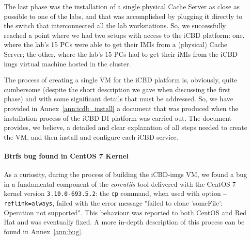 The last phase was the installation of a single physical Cache Server as close as possible to one of the labs, and that was accomplished by plugging it directly to the switch that interconnected all the lab 
workstations. So, we successfully reached a point where we had two setups with access to the iCBD platform: one, where the lab’s 15 PCs were able to get their IMIs from a (physical) Cache Server; the other, where the lab’s 15 PCs had to get their iMIs from the iCBD-imgs virtual machine hosted in the cluster.

The process of creating a single VM for the iCBD platform is, obviously, quite cumbersome (despite the short description we gave when discussing the first phase) and with some significant details that must be addressed. So, we have provided in Annex~\ref{ann:icdb_install} a document that was produced when the installation process of the iCBD DI platform was carried out. The document provides, we believe, a detailed and clear explanation of all steps needed to create the VM, and then install and configure each iCBD service.

\paragraph{Btrfs bug found in CentOS 7 Kernel}
\label{par:impl_centos_bug}

As a curiosity, during the process of building the iCBD-imgs VM, we found a bug in a fundamental component of the \textit{coreutils} tool delivered with the CentOS 7 kernel version \texttt{3.10.0-693.5.2}: the \texttt{cp} command, when used with option \texttt{--reflink=always}, failed with the error message "failed to clone ’someFile’: Operation not supported". This behaviour was reported to both CentOS and Red Hat and was eventually fixed. A more in-depth description of this process can be found in Annex~\ref{ann:bug}.







